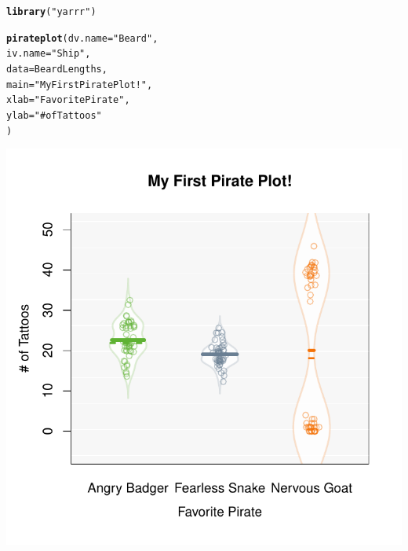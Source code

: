 \documentclass{tufte-book}\usepackage[]{graphicx}\usepackage[]{color}
\makeatletter
\def\maxwidth{ %
  \ifdim\Gin@nat@width>\linewidth
    \linewidth
  \else
    \Gin@nat@width
  \fi
}
\newcommand{\hlstr}[1]{\textcolor[rgb]{0.192,0.494,0.8}{#1}}%
\newcommand{\hlstd}[1]{\textcolor[rgb]{0.345,0.345,0.345}{#1}}%
\newcommand{\hlkwc}[1]{\textcolor[rgb]{0.333,0.667,0.333}{#1}}%
\newcommand{\hlkwd}[1]{\textcolor[rgb]{0.737,0.353,0.396}{\textbf{#1}}}%
\newenvironment{kframe}{%
 \def\at@end@of@kframe{}%
 \ifinner\ifhmode%
  \def\at@end@of@kframe{\end{minipage}}%
  \begin{minipage}{\columnwidth}%
 \fi\fi%
 \def\FrameCommand##1{\hskip\@totalleftmargin \hskip-\fboxsep
 \colorbox{shadecolor}{##1}\hskip-\fboxsep
     \hskip-\linewidth \hskip-\@totalleftmargin \hskip\columnwidth}%
 \MakeFramed {\advance\hsize-\width
   \@totalleftmargin\z@ \linewidth\hsize
   \@setminipage}}%
 {\par\unskip\endMakeFramed%
 \at@end@of@kframe}
\newenvironment{knitrout}{}{} %
\makeatother
\begin{document}
\begin{marginfigure}
\begin{footnotesize}
\begin{knitrout}
\end{knitrout}
\end{footnotesize}


\end{marginfigure}

\begin{footnotesize}
\begin{knitrout}
\color{fgcolor}\begin{kframe}
\begin{alltt}
\hlkwd{library}\hlstd{(}\hlstr{"yarrr"}\hlstd{)}

\hlkwd{pirateplot}\hlstd{(}\hlkwc{dv.name} \hlstd{=} \hlstr{"Beard"}\hlstd{,}
           \hlkwc{iv.name} \hlstd{=} \hlstr{"Ship"}\hlstd{,}
         \hlkwc{data} \hlstd{= BeardLengths,}
         \hlkwc{main} \hlstd{=} \hlstr{"My First Pirate Plot!"}\hlstd{,}
         \hlkwc{xlab} \hlstd{=} \hlstr{"Favorite Pirate"}\hlstd{,}
         \hlkwc{ylab} \hlstd{=} \hlstr{"# of Tattoos"}
         \hlstd{)}
\end{alltt}
\end{kframe}
\includegraphics[width=\maxwidth]{figure/unnamed-chunk-200-1} 

\end{knitrout}
\end{footnotesize}
\end{document}

